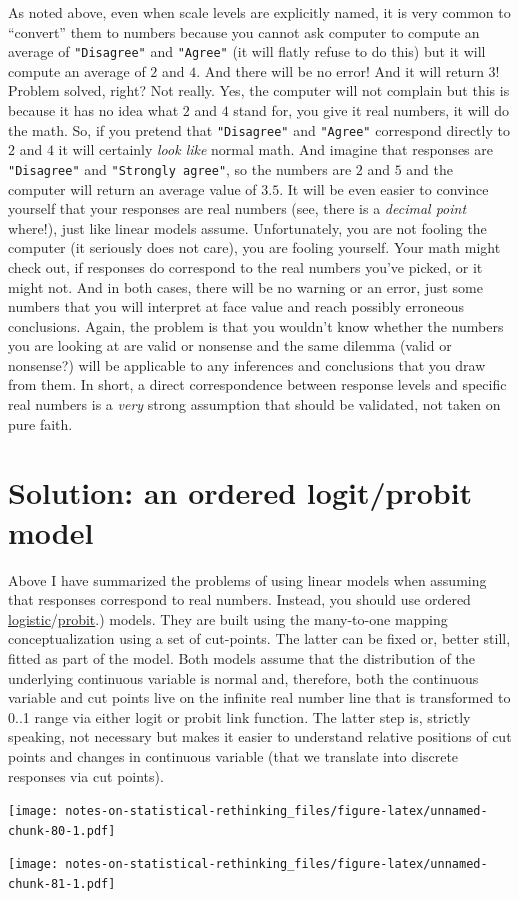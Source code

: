 \documentclass[
]{book}
\begin{document}
As noted above, even when scale levels are explicitly named, it is very common to ``convert'' them to numbers because you cannot ask computer to compute an average of \texttt{"Disagree"} and \texttt{"Agree"} (it will flatly refuse to do this) but it will compute an average of \(2\) and \(4\). And there will be no error! And it will return \(3\)! Problem solved, right? Not really. Yes, the computer will not complain but this is because it has no idea what \(2\) and \(4\) stand for, you give it real numbers, it will do the math. So, if you pretend that \texttt{"Disagree"} and \texttt{"Agree"} correspond directly to \(2\) and \(4\) it will certainly \emph{look like} normal math. And imagine that responses are \texttt{"Disagree"} and \texttt{"Strongly\ agree"}, so the numbers are \(2\) and \(5\) and the computer will return an average value of \(3.5\). It will be even easier to convince yourself that your responses are real numbers (see, there is a \emph{decimal point} where!), just like linear models assume. Unfortunately, you are not fooling the computer (it seriously does not care), you are fooling yourself. Your math might check out, if responses do correspond to the real numbers you've picked, or it might not. And in both cases, there will be no warning or an error, just some numbers that you will interpret at face value and reach possibly erroneous conclusions. Again, the problem is that you wouldn't know whether the numbers you are looking at are valid or nonsense and the same dilemma (valid or nonsense?) will be applicable to any inferences and conclusions that you draw from them. In short, a direct correspondence between response levels and specific real numbers is a \emph{very} strong assumption that should be validated, not taken on pure faith.

\hypertarget{solution-an-ordered-logitprobit-model}{%
\section{Solution: an ordered logit/probit model}\label{solution-an-ordered-logitprobit-model}}

Above I have summarized the problems of using linear models when assuming that responses correspond to real numbers. Instead, you should use ordered \href{https://en.wikipedia.org/wiki/Ordered_logit}{logistic}/\href{https://en.wikipedia.org/wiki/Ordered_probit\#:~:text=In\%20statistics\%2C\%20ordered\%20probit\%20is,fair\%2C\%20good\%2C\%20excellent}{probit}.) models. They are built using the many-to-one mapping conceptualization using a set of cut-points. The latter can be fixed or, better still, fitted as part of the model. Both models assume that the distribution of the underlying continuous variable is normal and, therefore, both the continuous variable and cut points live on the infinite real number line that is transformed to 0..1 range via either logit or probit link function. The latter step is, strictly speaking, not necessary but makes it easier to understand relative positions of cut points and changes in continuous variable (that we translate into discrete responses via cut points).

\texttt{[image: notes-on-statistical-rethinking\_files/figure-latex/unnamed-chunk-80-1.pdf]}

\texttt{[image: notes-on-statistical-rethinking\_files/figure-latex/unnamed-chunk-81-1.pdf]}

  
\end{document}
